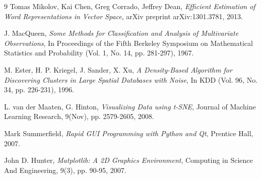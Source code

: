 \begin{thebibliography}{9}
Tomas Mikolov, Kai Chen, Greg Corrado, Jeffrey Dean, \emph{Efficient Estimation of Word Representations in Vector Space}, arXiv preprint arXiv:1301.3781, 2013.

J. MacQueen, \emph{Some Methods for Classification and Analysis of Multivariate Observations}, In Proceedings of the Fifth Berkeley Symposium on Mathematical Statistics and Probability (Vol. 1, No. 14, pp. 281-297), 1967.

M. Ester, H. P. Kriegel, J. Sander, X. Xu, \emph{A Density-Based Algorithm for Discovering Clusters in Large Spatial Databases with Noise}, In KDD (Vol. 96, No. 34, pp. 226-231), 1996.

L. van der Maaten, G. Hinton, \emph{Visualizing Data using t-SNE}, Journal of Machine Learning Research, 9(Nov), pp. 2579-2605, 2008.


Mark Summerfield, \emph{Rapid GUI Programming with Python and Qt}, Prentice Hall, 2007.

John D. Hunter, \emph{Matplotlib: A 2D Graphics Environment}, Computing in Science And Engineering, 9(3), pp. 90-95, 2007.





\end{thebibliography}

